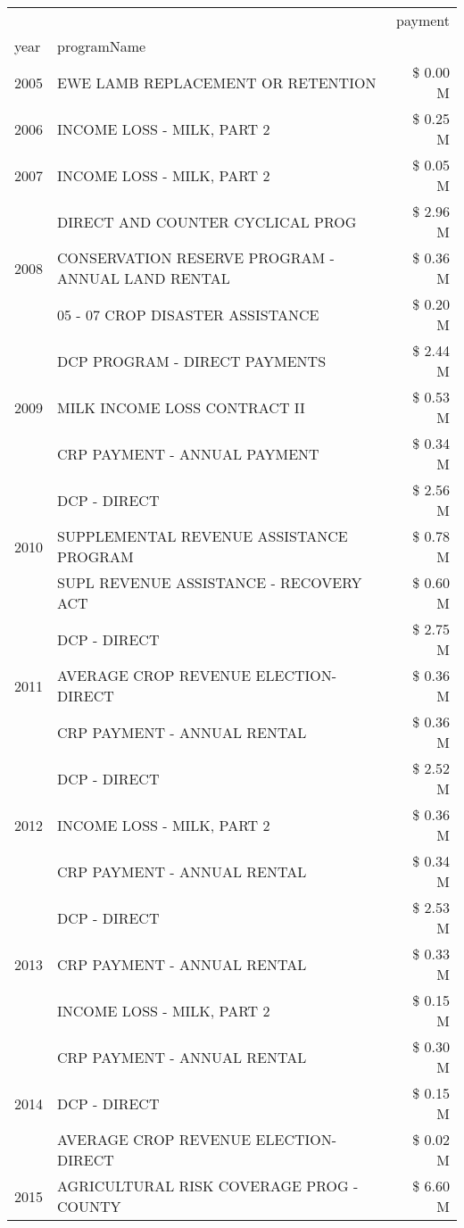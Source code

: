 \begin{tabular}{llr}
\toprule
 &  & payment \\
year & programName &  \\
\midrule
2005 & EWE LAMB REPLACEMENT OR RETENTION & \$ 0.00 M \\
\cline{1-3}
2006 & INCOME LOSS - MILK, PART 2 & \$ 0.25 M \\
\cline{1-3}
2007 & INCOME LOSS - MILK, PART 2 & \$ 0.05 M \\
\cline{1-3}
\multirow[t]{3}{*}{2008} & DIRECT AND COUNTER CYCLICAL PROG & \$ 2.96 M \\
 & CONSERVATION RESERVE PROGRAM - ANNUAL LAND RENTAL & \$ 0.36 M \\
 & 05 - 07 CROP DISASTER ASSISTANCE & \$ 0.20 M \\
\cline{1-3}
\multirow[t]{3}{*}{2009} & DCP PROGRAM - DIRECT PAYMENTS & \$ 2.44 M \\
 & MILK INCOME LOSS CONTRACT II & \$ 0.53 M \\
 & CRP PAYMENT - ANNUAL PAYMENT & \$ 0.34 M \\
\cline{1-3}
\multirow[t]{3}{*}{2010} & DCP - DIRECT & \$ 2.56 M \\
 & SUPPLEMENTAL REVENUE ASSISTANCE PROGRAM & \$ 0.78 M \\
 & SUPL REVENUE ASSISTANCE - RECOVERY ACT & \$ 0.60 M \\
\cline{1-3}
\multirow[t]{3}{*}{2011} & DCP - DIRECT & \$ 2.75 M \\
 & AVERAGE CROP REVENUE ELECTION-DIRECT & \$ 0.36 M \\
 & CRP PAYMENT - ANNUAL RENTAL & \$ 0.36 M \\
\cline{1-3}
\multirow[t]{3}{*}{2012} & DCP - DIRECT & \$ 2.52 M \\
 & INCOME LOSS - MILK, PART 2 & \$ 0.36 M \\
 & CRP PAYMENT - ANNUAL RENTAL & \$ 0.34 M \\
\cline{1-3}
\multirow[t]{3}{*}{2013} & DCP - DIRECT & \$ 2.53 M \\
 & CRP PAYMENT - ANNUAL RENTAL & \$ 0.33 M \\
 & INCOME LOSS - MILK, PART 2 & \$ 0.15 M \\
\cline{1-3}
\multirow[t]{3}{*}{2014} & CRP PAYMENT - ANNUAL RENTAL & \$ 0.30 M \\
 & DCP - DIRECT & \$ 0.15 M \\
 & AVERAGE CROP REVENUE ELECTION-DIRECT & \$ 0.02 M \\
\cline{1-3}
\multirow[t]{3}{*}{2015} & AGRICULTURAL RISK COVERAGE PROG - COUNTY & \$ 6.60 M \\

\end{tabular}
